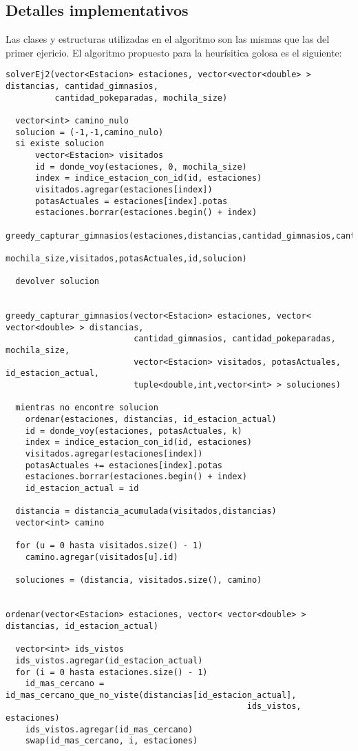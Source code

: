         \subsection{Detalles implementativos}
            Las clases y estructuras utilizadas en el algoritmo son las mismas que las del primer ejericio. El algoritmo propuesto para la heurísitica golosa es el siguiente: 

            \begin{codesnippet}
            \begin{verbatim}
solverEj2(vector<Estacion> estaciones, vector<vector<double> > distancias, cantidad_gimnasios,
          cantidad_pokeparadas, mochila_size)
  
  vector<int> camino_nulo
  solucion = (-1,-1,camino_nulo)
  si existe solucion 
      vector<Estacion> visitados
      id = donde_voy(estaciones, 0, mochila_size)
      index = indice_estacion_con_id(id, estaciones)
      visitados.agregar(estaciones[index])
      potasActuales = estaciones[index].potas
      estaciones.borrar(estaciones.begin() + index)
      greedy_capturar_gimnasios(estaciones,distancias,cantidad_gimnasios,cantidad_pokeparadas,
                                mochila_size,visitados,potasActuales,id,solucion)
  
  devolver solucion


greedy_capturar_gimnasios(vector<Estacion> estaciones, vector< vector<double> > distancias, 
                          cantidad_gimnasios, cantidad_pokeparadas, mochila_size, 
                          vector<Estacion> visitados, potasActuales, id_estacion_actual, 
                          tuple<double,int,vector<int> > soluciones)

  mientras no encontre solucion 
    ordenar(estaciones, distancias, id_estacion_actual)
    id = donde_voy(estaciones, potasActuales, k)
    index = indice_estacion_con_id(id, estaciones)
    visitados.agregar(estaciones[index])
    potasActuales += estaciones[index].potas
    estaciones.borrar(estaciones.begin() + index)
    id_estacion_actual = id

  distancia = distancia_acumulada(visitados,distancias)
  vector<int> camino

  for (u = 0 hasta visitados.size() - 1)
    camino.agregar(visitados[u].id)

  soluciones = (distancia, visitados.size(), camino)


ordenar(vector<Estacion> estaciones, vector< vector<double> > distancias, id_estacion_actual)

  vector<int> ids_vistos
  ids_vistos.agregar(id_estacion_actual)
  for (i = 0 hasta estaciones.size() - 1)
    id_mas_cercano = id_mas_cercano_que_no_viste(distancias[id_estacion_actual], 
                                                 ids_vistos, estaciones)
    ids_vistos.agregar(id_mas_cercano)
    swap(id_mas_cercano, i, estaciones)
  

            \end{verbatim}
            \end{codesnippet}






